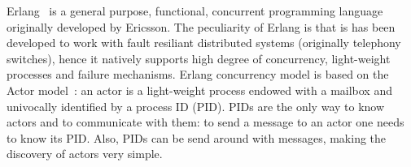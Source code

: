 Erlang~\cite{Cesarini,Armstrong} is a general purpose, functional, concurrent programming language originally developed by Ericsson.
The peculiarity of Erlang is that is has been developed to work with fault resiliant distributed systems (originally telephony switches), hence it natively supports high degree of concurrency, light-weight processes and  failure mechanisms. Erlang concurrency model is based on the Actor model~\cite{actor}: an actor is a light-weight process endowed with a mailbox and univocally identified by a process ID (PID). PIDs are the only way to know actors and to communicate with them: to send a message to an actor one needs to know its PID. Also, PIDs can be send around with messages, making the discovery of actors very simple. 